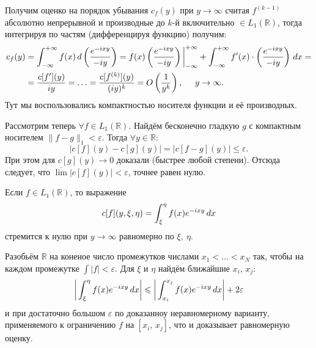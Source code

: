 \begin{uproof}
    Получим оценко на порядок убывания $c_f(y)$ при $y \to \infty$ считая $f ^{(k-1)}$ абсолютно непрерывной и производные до $k$-й включительно $\in L_1 \left(\mathbb{R}\right)$, тогда интегрируя по частям (дифференцируя функцию) получим:
    \begin{align*}
        c_f (y) &= \int_{-\infty}^{+\infty} f(x) \, d \left(
            \frac{e^{-ixy}}{-iy}
        \right) = f(x) \left(
            \frac{e^{-ixy}}{-iy}
        \right) \bigg|_{-\infty}^{+\infty} + \int_{-\infty}^{+\infty} f'(x) \cdot \left(
            \frac{e^{-ixy}}{-iy}
        \right) \, d x 
        = \\ &=
        \frac{c[{f'}](y)}{iy} = \ldots = \frac{c[f^{(k)}](y)}{(iy)^k} = O\left(\frac{1}{y^k}\right), \hspace{5 mm} y \to \infty.
    \end{align*}
    Тут мы воспользовались компактностью носителя функции и её производных. 

    Рассмотрим теперь $\forall  f \in L_1(\mathbb{R})$. Найдём бесконечно гладкую $g$ с компактным носителем $\|f-g\|_1 < \varepsilon$. Тогда $\forall y \in \mathbb{R}$:
    \begin{equation*}
        |c[f](y) - c[g](y)| = |c[f-g](y)| \leq \varepsilon.
    \end{equation*}
    При этом для $c[g] (y) \to 0$ доказали (быстрее любой степени). Отсюда следует, что $\overline{\lim} |c[f](y)| < \varepsilon$, точнее равен нулю. 
\end{uproof}



\begin{to_thr}
    Если $f \in L_1(\mathbb{R})$, то выражение
    \begin{equation*}
        c[f](y, \xi, \eta) = \int_\xi^\eta f(x) e^{-ixy} \, d x
    \end{equation*}
    стремится к нулю при $y \to \infty$ равномерно по $\xi, \ \eta$.
\end{to_thr}

\begin{uproof}
    Разобьём $\mathbb{R}$ на коненое число промежутков числами $x_1 < \ldots < x_N$ так, чтобы на каждом промежутке $\int |f| < \varepsilon $. Для $\xi$ и $\eta$ найдём ближайшие $x_i,\, x_j$:
    \begin{equation*}
        \bigg| 
            \int_{\xi}^{\eta} f(x) e^{-ixy} \, d x
        \bigg| \leqslant 
        \bigg|
            \int_{x_i}^{x_j} f(x) e^{-ixy} \, d x
        \bigg| + 2 \varepsilon
    \end{equation*}
    и при достаточно большом $\varepsilon$ по доказанноу неравномерному варианту, применяемого к ограничению $f$ на $[x_i,\, x_j]$, что и доказывает равномерную оценку. 
\end{uproof}

